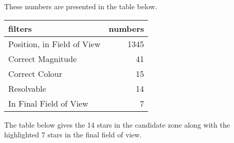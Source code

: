 \documentclass[]{elsarticle} %
\begin{document}
These numbers are presented in the table below.

\begin{tabular}{l|r}
\hline
filters & numbers\\
\hline
Position, in Field of View & 1345\\
\hline
Correct Magnitude & 41\\
\hline
Correct Colour & 15\\
\hline
Resolvable & 14\\
\hline
In Final Field of View & 7\\
\hline
\end{tabular}

\vskip 0.2in

The table below gives the 14 stars in the candidate zone along with the
highlighted 7 stars in the final field of view.

\vskip 0.2in
\end{document}
